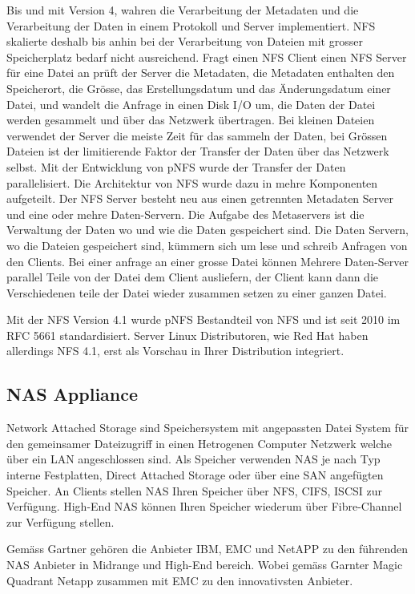 Bis und mit Version 4, wahren die Verarbeitung der Metadaten und die Verarbeitung der Daten in einem Protokoll und Server implementiert. NFS skalierte deshalb bis anhin bei der Verarbeitung von Dateien mit grosser Speicherplatz bedarf nicht ausreichend. Fragt einen NFS Client einen NFS Server für eine Datei an prüft der Server die Metadaten, die Metadaten enthalten den Speicherort, die Grösse, das Erstellungsdatum und das Änderungsdatum einer Datei, und wandelt die Anfrage in einen Disk I/O um, die Daten der Datei werden gesammelt und über das Netzwerk übertragen. Bei kleinen Dateien verwendet der Server die meiste Zeit für das sammeln der Daten, bei Grössen Dateien ist der limitierende Faktor der Transfer der Daten über das Netzwerk selbst.
Mit der Entwicklung von pNFS wurde der Transfer der Daten parallelisiert. Die Architektur von NFS wurde dazu in mehre Komponenten aufgeteilt. Der NFS Server besteht neu aus einen getrennten Metadaten Server und eine oder mehre Daten-Servern. Die Aufgabe des Metaservers ist die Verwaltung der Daten wo und wie die Daten gespeichert sind. Die Daten Servern, wo die Dateien gespeichert sind, kümmern sich um lese und schreib Anfragen von den Clients.
Bei einer anfrage an einer grosse Datei können Mehrere Daten-Server parallel Teile von der Datei dem Client ausliefern, der Client kann dann die Verschiedenen teile der Datei wieder zusammen setzen zu einer ganzen Datei. \cite{Shepler2010}\cite{Group2010}

Mit der NFS Version 4.1 wurde pNFS Bestandteil von NFS und ist seit 2010 im RFC 5661 standardisiert. Server Linux Distributoren, wie Red Hat haben allerdings NFS 4.1, erst als Vorschau in Ihrer Distribution integriert.\cite{EastJacquelynnMichaelHidep-Smith2011}




\subsection{NAS Appliance}

Network Attached Storage sind Speichersystem mit angepassten Datei System für den gemeinsamer Dateizugriff in einen Hetrogenen Computer Netzwerk welche über ein LAN angeschlossen sind. Als Speicher verwenden NAS je nach Typ interne Festplatten, Direct Attached Storage oder über eine SAN angefügten Speicher.
An Clients stellen NAS Ihren Speicher über NFS, CIFS, ISCSI zur Verfügung. High-End NAS können Ihren Speicher wiederum über Fibre-Channel zur Verfügung stellen.

Gemäss Gartner gehören die Anbieter IBM, EMC und NetAPP zu den führenden NAS Anbieter in Midrange und High-End bereich. Wobei gemäss Garnter Magic Quadrant Netapp zusammen mit EMC zu den innovativsten Anbieter.

